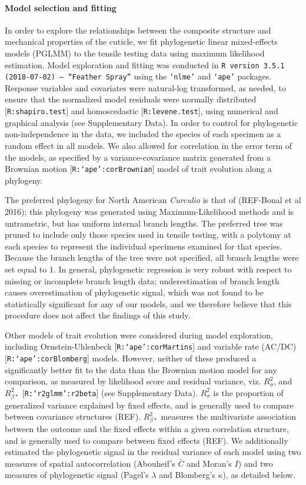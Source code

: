 \documentclass[twocolumn, linenumbers, superscriptaddress, nofootinbib]{revtex4-1}
\begin{document}
			\paragraph*{Model selection and fitting}
				In order to explore the relationships between the composite structure and mechanical properties of the cuticle, we fit phylogenetic linear mixed-effects models (PGLMM) to the tensile testing data using maximum likelihood estimation.
				Model exploration and fitting was conducted in \texttt{R version 3.5.1 (2018-07-02) -- ``Feather Spray''} using the \texttt{`nlme'} and \texttt{`ape'} packages.
				Response variables and covariates were natural-log transformed, as needed, to ensure that the normalized model residuals were normally distributed [\texttt{R:shapiro.test}] and homoscedastic [\texttt{R:levene.test}], using numerical and graphical analysis (see Supplementary Data).
				In order to control for phylogenetic non-independence in the data, we included the species of each specimen as a random effect in all models.
				We also allowed for correlation in the error term of the models, as specified by a variance-covariance matrix generated from a Brownian motion [\texttt{R:`ape':corBrownian}] model of trait evolution along a phylogeny.
				
				The preferred phylogeny for North American \textit{Curculio} is that of (REF-Bonal et al 2016); this phylogeny was generated using Maximum-Likelihood methods and is untrametric, but has uniform internal branch lengths.
				The preferred tree was pruned to include only those species used in tensile testing, with a polytomy at each species to represent the individual specimens examined for that species.
				Because the branch lengths of the tree were not specified, all branch lengths were set equal to 1.
				In general, phylogenetic regression is very robust with respect to missing or incomplete branch length data; underestimation of branch length causes overestimation of phylogenetic signal, which was not found to be statistically significant for any of our models, and we therefore believe that this procedure does not affect the findings of this study.
				
				Other models of trait evolution were considered during model exploration, including Ornstein-Uhlenbeck [\texttt{R:`ape':corMartins}] and variable rate (AC/DC) [\texttt{R:`ape':corBlomberg}] models.
				However, neither of these produced a significantly better fit to the data than the Brownian motion model for any comparison, as measured by likelihood score and residual variance, viz. $R^2_{\sigma}$, and $R^2_{\beta*}$ [\texttt{R:`r2glmm':r2beta}] (see Supplementary Data).
				$R^{2}_{\sigma}$ is the proportion of generalized variance explained by fixed effects, and is generally used to compare between covariance structures (REF).
				$R^2_{\beta*}$ measures the multivariate association between the outcome and the fixed effects within a given correlation structure, and is generally used to compare between fixed effects (REF).
				We additionally estimated the phylogenetic signal in the residual variance of each model using two measures of spatial autocorrelation (Abouheif's $\bar{C}$ and Moran's $I$) and two measures of phylogenetic signal (Pagel's $\lambda$ and Blomberg's $\kappa$), as detailed below.
				
\end{document}

